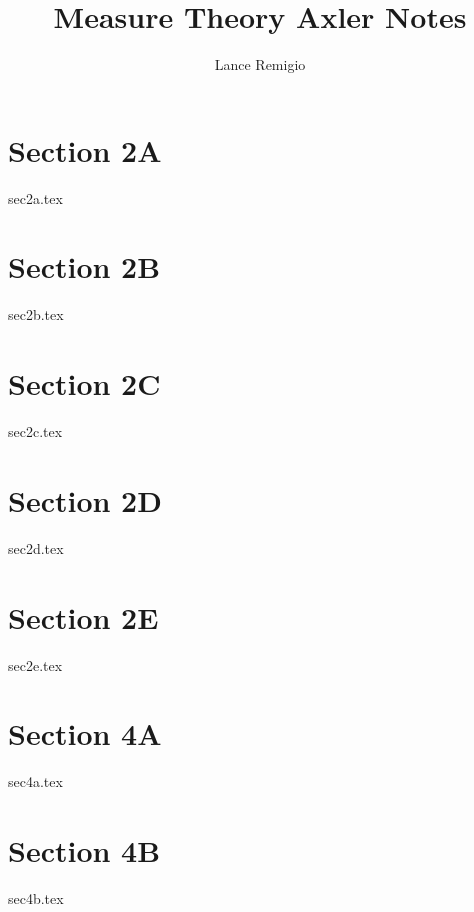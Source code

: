 \documentclass[a4paper]{article}
\title{Measure Theory Axler Notes}
\author{Lance Remigio}
\begin{document}
\maketitle
\tableofcontents

\section{Section 2A}

{sec2a.tex}

\section{Section 2B}

{sec2b.tex}

\section{Section 2C}

{sec2c.tex}

\section{Section 2D}

{sec2d.tex}

\section{Section 2E}

{sec2e.tex}

\section{Section 4A}

{sec4a.tex}

\section{Section 4B}

{sec4b.tex}
\end{document}
